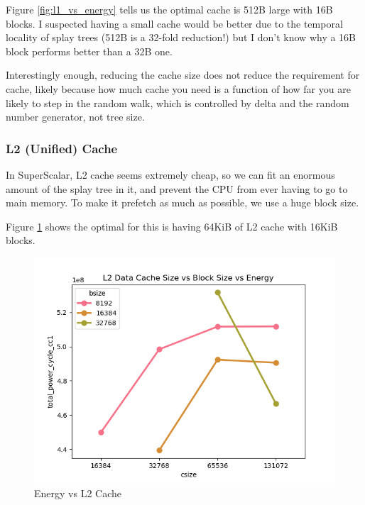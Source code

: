 \documentclass{article}
\newcommand{\optimisation}[1]{
  
}
\begin{document}
\begin{multicols}{2}
  Figure \ref{fig:l1_vs_energy} tells us the optimal cache is 512B large with 16B blocks. I suspected having a small cache would be better due to the temporal locality of splay trees (512B is a 32-fold reduction!) but I don't know why a 16B block performs better than a 32B one.

  Interestingly enough, reducing the cache size does not reduce the requirement for cache, likely because how much cache you need is a function of how far you are likely to step in the random walk, which is controlled by delta and the random number generator, not tree size.

  \optimisation{dl1_cache}

  \subsubsection{L2 (Unified) Cache}
  In SuperScalar, L2 cache seems extremely cheap, so we can fit an enormous amount of the splay tree in it, and prevent the CPU from ever having to go to main memory. To make it prefetch as much as possible, we use a huge block size.

  Figure \ref{fig:l2_vs_energy} shows the optimal for this is having 64KiB of L2 cache with 16KiB blocks.

  \begin{figure}[H]
    \centering
    \includegraphics[width=\linewidth]{./assets/l2_vs_energy.png}
    \caption{Energy vs L2 Cache}
    \label{fig:l2_vs_energy}
  \end{figure}

  \optimisation{l2_cache}


\end{multicols}
\end{document}
